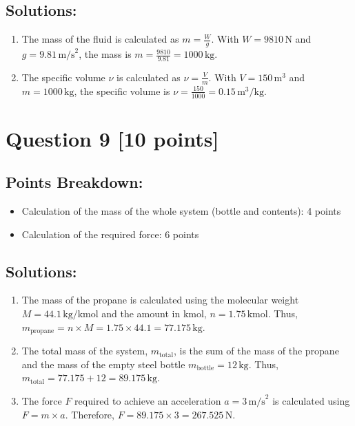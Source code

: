 \documentclass[12pt]{article}
\begin{document}
\subsection*{Solutions:}
\begin{enumerate}
    \item The mass of the fluid is calculated as \( m = \frac{W}{g} \). With \( W = 9810 \, \text{N} \) and \( g = 9.81 \, \text{m/s}^2 \), the mass is \( m = \frac{9810}{9.81} = 1000 \, \text{kg} \).
    \item The specific volume \( \nu \) is calculated as \( \nu = \frac{V}{m} \). With \( V = 150 \, \text{m}^3 \) and \( m = 1000 \, \text{kg} \), the specific volume is \( \nu = \frac{150}{1000} = 0.15 \, \text{m}^3/\text{kg} \).
\end{enumerate}

\newpage
\section*{Question 9 [10 points]}
\subsection*{Points Breakdown:}
\begin{itemize}
    \item Calculation of the mass of the whole system (bottle and contents): 4 points
    \item Calculation of the required force: 6 points
\end{itemize}

\subsection*{Solutions:}
\begin{enumerate}
    \item The mass of the propane is calculated using the molecular weight \( M = 44.1 \, \text{kg/kmol} \) and the amount in kmol, \( n = 1.75 \, \text{kmol} \). Thus, \( m_{\text{propane}} = n \times M = 1.75 \times 44.1 = 77.175 \, \text{kg} \).
    
    \item The total mass of the system, \( m_{\text{total}} \), is the sum of the mass of the propane and the mass of the empty steel bottle \( m_{\text{bottle}} = 12 \, \text{kg} \). Thus, \( m_{\text{total}} = 77.175 + 12 = 89.175 \, \text{kg} \).
    
    \item The force \( F \) required to achieve an acceleration \( a = 3 \, \text{m/s}^2 \) is calculated using \( F = m \times a \). Therefore, \( F = 89.175 \times 3 = 267.525 \, \text{N} \).
\end{enumerate}
\end{document}
